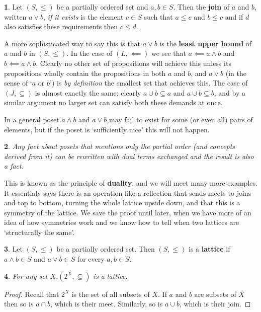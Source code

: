 \documentclass[oneside,english]{amsbook}
\numberwithin{section}{chapter}
\theoremstyle{plain}
\newtheorem{thm}{\protect\theoremname}
\theoremstyle{definition}
\newtheorem{defn}[thm]{\protect\definitionname}
\providecommand{\definitionname}{Definition}
\providecommand{\theoremname}{Theorem}
\begin{document}
\begin{defn} 
	Let $(S,\le)$ be a partially ordered set and $a,b\in S$. Then the \textbf{join} of $a$ and $b$, written $a\lor b$, \emph{if it exists} is the element $c\in S$ such that $a\le c$ and $b\le c$ and if $d$ also satisfies these requirements then $c\le d$. 
\end{defn} 

A more sophisticated way to say this is that $a\lor b$ is the \textbf{least upper bound }of $a$ and $b$ in $(S,\le)$. In the case of $(L,\impliedby)$ we see that $a\impliedby a\land b$ and $b\impliedby a\land b$. Clearly no other set of propositions will achieve this unless its propositions wholly contain the propositions in both $a$ and $b$, and $a\lor b$ (in the sense of `$a$ or $b$') is \emph{by definition} the smallest set that achieves this. The case of $(J,\subseteq)$ is almost exactly the same; clearly $a\cup b\subseteq a$ and $a\cup b\subseteq b$, and by a similar argument no larger set can satisfy both these demands at once.

In a general poset $a\land b$ and $a\lor b$ may fail to exist for some (or even all) pairs of elements, but if the poset is `sufficiently nice' this will not happen. 

\begin{thm} 
	Any fact about posets that mentions only the partial order (and concepts derived from it) can be rewritten with dual terms exchanged and the result is also a fact. 
\end{thm} 

This is known as the principle of \textbf{duality}, and we will meet many more examples. It essentialy says there is an operation like a reflection that sends meets to joins and top to bottom, turning the whole lattice upside down, and that this is a symmetry of the lattice. We save the proof until later, when we have more of an idea of how symmetries work and we know how to tell when two lattices are `structurally the same'. 

\begin{defn} 
	Let $(S,\le)$ be a partially ordered set. Then $(S,\le)$ is a \textbf{lattice} if $a\land b\in S$ and $a\lor b\in S$ for every $a,b\in S$.
\end{defn} 

\begin{thm} 
	For any set \emph{$X$},$(2^{X},\subseteq)$ is a lattice.
\end{thm} 

\begin{proof} 
	Recall that $2^{X}$ is the set of all subsets of $X$. If $a$ and $b$ are subsets of $X$ then so is $a\cap b$, which is their meet. Similarly, so is $a\cup b$, which is their join.  
\end{proof} 
\end{document}
